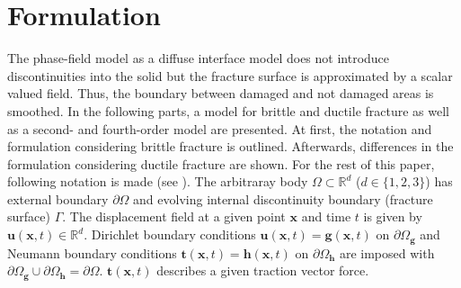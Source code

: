 \section{Formulation} \label{sec:formul}
The phase-field model as a diffuse interface model does not introduce discontinuities into the solid but the fracture surface is approximated by a scalar valued field. Thus, the boundary between damaged and not damaged areas is smoothed. In the following parts, a model for brittle and ductile fracture as well as a second- and fourth-order model are presented. At first, the notation and formulation considering brittle fracture is outlined. Afterwards, differences in the formulation considering ductile fracture are shown. For the rest of this paper, following notation is made (see ). The arbitraray body $\Omega\subset\mathbb{R}^{d}$ ($d\in\{1,2,3\}$) has external boundary $\partial\Omega$ and evolving internal discontinuity boundary (fracture surface) $\Gamma$. The displacement field at a given point $\mathbf{x}$ and time $t$ is given by $\mathbf{u}\left(\mathbf{x},t\right)\in\mathbb{R}^{d}$. Dirichlet boundary conditions $\mathbf{u}\left(\mathbf{x},t\right)=\mathbf{g}\left(\mathbf{x},t\right)$ on $\partial\Omega_{\mathbf{g}}$ and Neumann boundary conditions $\mathbf{t}\left(\mathbf{x},t\right)=\mathbf{h}\left(\mathbf{x},t\right)$ on $\partial\Omega_{\mathbf{h}}$ are imposed with $\partial\Omega_{\mathbf{g}}\cup\partial\Omega_{\mathbf{h}}=\partial\Omega$. $\mathbf{t}\left(\mathbf{x},t\right)$ describes a given traction vector force.
